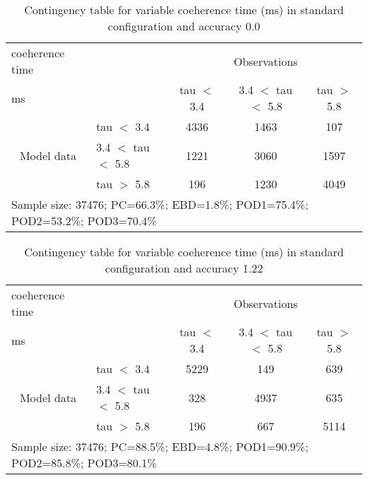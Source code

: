 \documentclass[11pt,english]{article}
\begin{document}
\newpage

\clearpage
\begin{table}[]
\begin{center}
\begin{tabular}{llccc}
\hline
{coeherence time}                                       &                                                    & \multicolumn{3}{c}{Observations}                 \\
{ms}                                       &                             & tau $<$ 3.4   & 3.4 $<$ tau $<$ 5.8 & tau $>$ 5.8 \\
\hline
\multicolumn{1}{c}{\multirow{3}{*}{Model data}}  & tau $<$ 3.4             & 4336                & 1463                       & 107              \\
                                                 & 3.4  $<$ tau $<$ 5.8 & 1221                & 3060                       & 1597              \\
                                                 & tau $>$ 5.8             & 196                & 1230                       & 4049              \\
\hline
\multicolumn{5}{l}{Sample size: 37476; PC=66.3\%; EBD=1.8\%; POD1=75.4\%; POD2=53.2\%; POD3=70.4\%}
\end{tabular}
\end{center}
\caption{Contingency table for variable coeherence time (ms) in standard configuration and accuracy 0.0}
\label{tab:contingencytauBEF}
\end{table}
\begin{table}[]
\begin{center}
\begin{tabular}{llccc}
\hline
{coeherence time}                                       &                                                    & \multicolumn{3}{c}{Observations}                 \\
{ms}                                       &                             & tau $<$ 3.4   & 3.4 $<$ tau $<$ 5.8 & tau $>$ 5.8 \\
\hline
\multicolumn{1}{c}{\multirow{3}{*}{Model data}}  & tau $<$ 3.4             & 5229                & 149                       & 639              \\
                                                 & 3.4  $<$ tau $<$ 5.8 & 328                & 4937                       & 635              \\
                                                 & tau $>$ 5.8             & 196                & 667                       & 5114              \\
\hline
\multicolumn{5}{l}{Sample size: 37476; PC=88.5\%; EBD=4.8\%; POD1=90.9\%; POD2=85.8\%; POD3=80.1\%}
\end{tabular}
\end{center}
\caption{Contingency table for variable coeherence time (ms) in standard configuration and accuracy 1.22}
\label{tab:contingencytauBEF}
\end{table}
\end{document}
